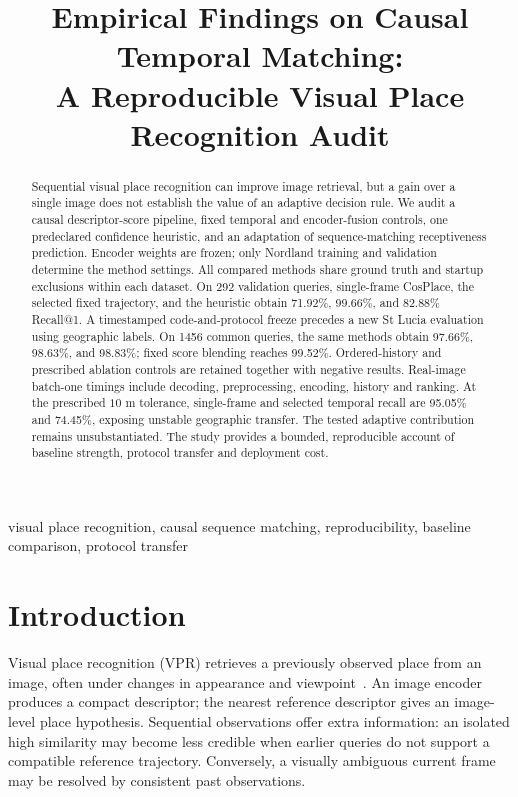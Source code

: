 \documentclass[conference]{IEEEtran}
\title{Empirical Findings on Causal Temporal Matching:\\A Reproducible Visual Place Recognition Audit}
\author{\IEEEauthorblockN{Mingyang Zhou}\IEEEauthorblockA{University of Chinese Academy of Sciences\\\textit{Additional authors and correspondence pending}}}
\begin{document}
\maketitle
\begin{abstract}
Sequential visual place recognition can improve image retrieval, but a gain over a single image does not establish the value of an adaptive decision rule. We audit a causal descriptor-score pipeline, fixed temporal and encoder-fusion controls, one predeclared confidence heuristic, and an adaptation of sequence-matching receptiveness prediction. Encoder weights are frozen; only Nordland training and validation determine the method settings. All compared methods share ground truth and startup exclusions within each dataset. On 292 validation queries, single-frame CosPlace, the selected fixed trajectory, and the heuristic obtain 71.92\%, 99.66\%, and 82.88\% Recall@1. A timestamped code-and-protocol freeze precedes a new St Lucia evaluation using geographic labels. On 1456 common queries, the same methods obtain 97.66\%, 98.63\%, and 98.83\%; fixed score blending reaches 99.52\%. Ordered-history and prescribed ablation controls are retained together with negative results. Real-image batch-one timings include decoding, preprocessing, encoding, history and ranking. At the prescribed $10$ m tolerance, single-frame and selected temporal recall are 95.05\% and 74.45\%, exposing unstable geographic transfer. The tested adaptive contribution remains unsubstantiated. The study provides a bounded, reproducible account of baseline strength, protocol transfer and deployment cost.
\end{abstract}
\begin{IEEEkeywords}visual place recognition, causal sequence matching, reproducibility, baseline comparison, protocol transfer\end{IEEEkeywords}

\section{Introduction}
Visual place recognition (VPR) retrieves a previously observed place from an image, often under changes in appearance and viewpoint~\cite{tutorial}. An image encoder produces a compact descriptor; the nearest reference descriptor gives an image-level place hypothesis. Sequential observations offer extra information: an isolated high similarity may become less credible when earlier queries do not support a compatible reference trajectory. Conversely, a visually ambiguous current frame may be resolved by consistent past observations.
\end{document}
